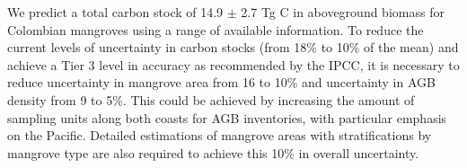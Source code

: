 \documentclass[review, authoryear]{elsarticle}   	%
\begin{document}
We predict a total carbon stock of 14.9 $\pm$ 2.7 Tg C in aboveground biomass for Colombian mangroves using a range of available information. 
To reduce the current levels of uncertainty in carbon stocks (from 18\% to 10\% of the mean) and achieve a Tier 3 level in accuracy as recommended by the IPCC, it is necessary to reduce uncertainty in mangrove area from 16 to 10\% and uncertainty in AGB density from 9 to 5\%. This could be achieved by increasing the amount of sampling units along both coasts for AGB inventories, with particular emphasis on the Pacific. Detailed estimations of mangrove areas with stratifications by mangrove type are also required to achieve this 10\% in overall uncertainty. 


%
%
\end{document}
